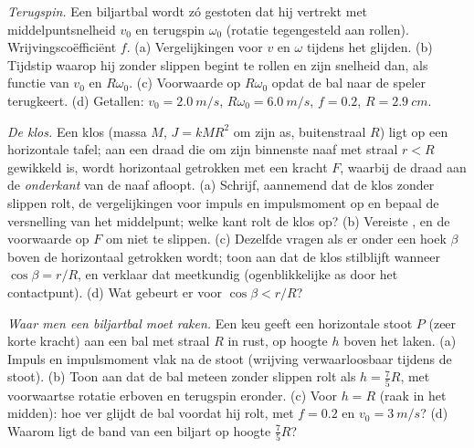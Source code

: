 \begin{exercise}[$\star\star$]\label{exo:b2:rigid-body-mechanics:9}
\emph{Terugspin.} Een biljartbal wordt zó gestoten dat hij vertrekt met
middelpuntsnelheid $v_0$ en terugspin $\omega_0$ (rotatie tegengesteld aan
rollen). Wrijvingscoëfficiënt $f$. (a) Vergelijkingen voor $v$ en $\omega$
tijdens het glijden. (b) Tijdstip waarop hij zonder slippen begint te
rollen en zijn snelheid dan, als functie van $v_0$ en $R\omega_0$.
(c) Voorwaarde op $R\omega_0$ opdat de bal naar de speler terugkeert.
(d) Getallen: $v_0 = \qty{2.0}{m/s}$, $R\omega_0 = \qty{6.0}{m/s}$, $f = 0.2$,
$R = \qty{2.9}{cm}$.
\end{exercise}

\begin{exercise}[$\star\star\star$]\label{exo:b2:rigid-body-mechanics:10}
\emph{De klos.} Een klos (massa $M$,  $J = kMR^2$ om zijn
as, buitenstraal $R$) ligt op een horizontale tafel; aan een draad die om
zijn binnenste naaf met straal $r < R$ gewikkeld is, wordt horizontaal
getrokken met een kracht $F$, waarbij de draad aan de \emph{onderkant} van
de naaf afloopt. (a) Schrijf, aannemend dat de klos zonder slippen rolt, de
vergelijkingen voor impuls en impulsmoment op en bepaal de versnelling van
het middelpunt; welke kant rolt de klos op? (b) Vereiste ,
en de voorwaarde op $F$ om niet te slippen. (c) Dezelfde vragen als er
onder een hoek $\beta$ boven de horizontaal getrokken wordt; toon aan dat
de klos stilblijft wanneer $\cos\beta = r/R$, en verklaar dat meetkundig
(ogenblikkelijke as door het contactpunt). (d) Wat gebeurt er voor
$\cos\beta < r/R$?
\end{exercise}

\begin{exercise}[$\star\star\star$]\label{exo:b2:rigid-body-mechanics:11}
\emph{Waar men een biljartbal moet raken.} Een keu geeft een horizontale
stoot $P$ (zeer korte kracht) aan een bal met straal $R$ in rust, op hoogte
$h$ boven het laken. (a) Impuls en impulsmoment vlak na de stoot (wrijving
verwaarloosbaar tijdens de stoot). (b) Toon aan dat de bal meteen zonder
slippen rolt als $h = \tfrac75R$, met voorwaartse rotatie erboven en
terugspin eronder. (c) Voor $h = R$ (raak in het midden): hoe ver glijdt de
bal voordat hij rolt, met $f = 0.2$ en $v_0 = \qty{3}{m/s}$? (d) Waarom
ligt de band van een biljart op hoogte $\tfrac75R$?
\end{exercise}

